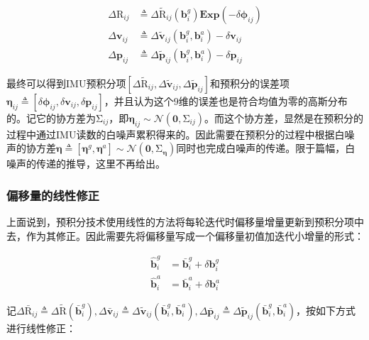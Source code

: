 \begin{equation}
\begin{aligned}
    \Delta\mathrm{R}_{ij} &\triangleq
        \Delta\tilde{\mathrm R}_{ij}(\mathbf{b}^g_i) \bm{Exp}(-\delta\bm\phi_{ij}) \\
    \Delta\mathbf{v}_{ij} &\triangleq
        \Delta\tilde{\mathbf v}_{ij}(\mathbf{b}^g_i, \mathbf{b}^a_i) - \delta\mathbf{v}_{ij} \\
    \Delta\mathbf{p}_{ij} &\triangleq
        \Delta\tilde{\mathbf p}_{ij}(\mathbf{b}^g_i, \mathbf{b}^a_i) - \delta\mathbf{p}_{ij}
\end{aligned}
\end{equation}

最终可以得到IMU预积分项$[\Delta\tilde{\mathrm R}_{ij},\Delta\tilde{\mathbf v}_{ij},\Delta\tilde{\mathbf p}_{ij}]$和预积分的误差项$\bm\eta_{ij} \triangleq \left[\delta\bm\phi_{ij},\delta\mathbf{v}_{ij},\delta\mathbf{p}_{ij}\right]$，并且认为这个$9$维的误差也是符合均值为零的高斯分布的。记它的协方差为$\mathrm{\Sigma}_{ij}$，即$\bm\eta_{ij} \sim \mathcal{N}\left(\mathbf{0},\mathrm{\Sigma}_{ij}\right)$。而这个协方差，显然是在预积分的过程中通过IMU读数的白噪声累积得来的。因此需要在预积分的过程中根据白噪声的协方差$\bm\eta \triangleq \left[\bm\eta^g,\bm\eta^a\right] \sim \mathcal{N}(\mathbf{0},\mathrm\Sigma_{\bm\eta})$同时也完成白噪声的传递。限于篇幅，白噪声的传递的推导，这里不再给出。

\subsubsection*{偏移量的线性修正}

上面说到，预积分技术使用线性的方法将每轮迭代时偏移量增量更新到预积分项中去，作为其修正。因此需要先将偏移量写成一个偏移量初值加迭代小增量的形式：

\begin{equation}
\begin{aligned}
    \hat{\mathbf b}^g_i &= \bar{\mathbf b}^g_i + \delta\mathbf{b}^g_i \\
    \hat{\mathbf b}^a_i &= \bar{\mathbf b}^a_i + \delta\mathbf{b}^a_i
\end{aligned}
\end{equation}

记$\Delta\bar{\mathrm R}_{ij}\triangleq\Delta\tilde{\mathrm R}(\bar{\mathbf b}^g_i), \Delta\bar{\mathbf v}_{ij}\triangleq\Delta\tilde{\mathbf v}_{ij}(\bar{\mathbf b}^g_i,\bar{\mathbf b}^a_i), \Delta\bar{\mathbf p}_{ij}\triangleq\Delta\tilde{\mathbf p}_{ij}(\bar{\mathbf b}^g_i,\bar{\mathbf b}^a_i)$，按如下方式进行线性修正：

